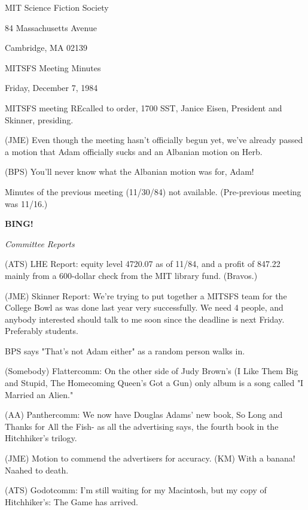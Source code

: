 \documentclass[12pt]{article}
\newcommand{\bing}{{\bf BING!} }
\newcommand{\goto}[1]{\bing \vskip 12pt \centerline{{\em{#1}}}}
\begin{document}
\begin{center}

MIT Science Fiction Society 

84 Massachusetts Avenue

Cambridge, MA 02139

\vspace{12pt}

MITSFS Meeting Minutes 

Friday, December 7, 1984

\end{center}
 
\vspace{18pt}

\setlength{\parskip}{6pt}

\noindent
MITSFS meeting REcalled to order, 1700 SST,
Janice Eisen, President and Skinner, presiding.

(JME) Even though the meeting hasn't officially begun yet, we've already passed a motion that Adam officially sucks and an Albanian motion on Herb.

(BPS) You'll never know what the Albanian motion was for, Adam!

Minutes of the previous meeting (11/30/84) not available. (Pre-previous meeting was 11/16.)

\goto{Committee Reports}

(ATS) LHE Report: equity level 4720.07 as of 11/84, and a profit of 847.22 mainly from a 600-dollar check from the MIT library fund. (Bravos.)

(JME) Skinner Report: We're trying to put together a MITSFS team for the College Bowl as was done last year very successfully. We need 4 people, and anybody interested should talk to me soon since the deadline is next Friday. Preferably students.

BPS says "That's not Adam either" as a random person walks in.

(Somebody) Flattercomm: On the other side of Judy Brown's (I Like Them Big and Stupid, The Homecoming Queen's Got a Gun) only album is a song called "I Married an Alien."

(AA) Panthercomm: We now have Douglas Adams' new book, So Long and Thanks for All the Fish- as all the advertising says, the fourth book in the Hitchhiker's trilogy.

(JME) Motion to commend the advertisers for accuracy. (KM) With a banana! Naahed to death.

(ATS) Godotcomm: I'm still waiting for my Macintosh, but my copy of Hitchhiker's: The Game has arrived.
\end{document}
